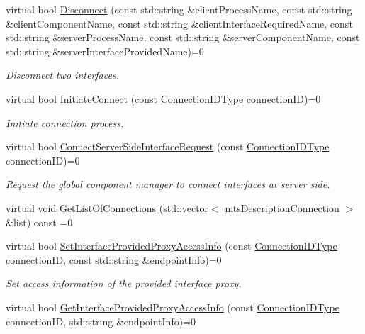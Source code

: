 \begin{DoxyCompactItemize}
virtual bool \hyperlink{classmts_manager_global_interface_a634c44151f8ef120526bc2be0cc3eb9a}{Disconnect} (const std\+::string \&client\+Process\+Name, const std\+::string \&client\+Component\+Name, const std\+::string \&client\+Interface\+Required\+Name, const std\+::string \&server\+Process\+Name, const std\+::string \&server\+Component\+Name, const std\+::string \&server\+Interface\+Provided\+Name)=0
\begin{DoxyCompactList}\small\item\em Disconnect two interfaces. \end{DoxyCompactList}\item 
virtual bool \hyperlink{classmts_manager_global_interface_aa9e2d02acd143d1a3ec7b7cc50c394ef}{Initiate\+Connect} (const \hyperlink{mts_forward_declarations_8h_ad3543bb11742e1766374ec96016d6547}{Connection\+I\+D\+Type} connection\+I\+D)=0
\begin{DoxyCompactList}\small\item\em Initiate connection process. \end{DoxyCompactList}\item 
virtual bool \hyperlink{classmts_manager_global_interface_a997fe786b674ece0eaf077040f170e08}{Connect\+Server\+Side\+Interface\+Request} (const \hyperlink{mts_forward_declarations_8h_ad3543bb11742e1766374ec96016d6547}{Connection\+I\+D\+Type} connection\+I\+D)=0
\begin{DoxyCompactList}\small\item\em Request the global component manager to connect interfaces at server side. \end{DoxyCompactList}\item 
virtual void \hyperlink{classmts_manager_global_interface_a95665a4a3b83ac9ca2e0e883832f657c}{Get\+List\+Of\+Connections} (std\+::vector$<$ mts\+Description\+Connection $>$ \&list) const =0
\item 
virtual bool \hyperlink{classmts_manager_global_interface_a40dab0f138d6305055bda1ce2f852f6e}{Set\+Interface\+Provided\+Proxy\+Access\+Info} (const \hyperlink{mts_forward_declarations_8h_ad3543bb11742e1766374ec96016d6547}{Connection\+I\+D\+Type} connection\+I\+D, const std\+::string \&endpoint\+Info)=0
\begin{DoxyCompactList}\small\item\em Set access information of the provided interface proxy. \end{DoxyCompactList}\item 
virtual bool \hyperlink{classmts_manager_global_interface_ade5d23408244c8bbecec7809419676c6}{Get\+Interface\+Provided\+Proxy\+Access\+Info} (const \hyperlink{mts_forward_declarations_8h_ad3543bb11742e1766374ec96016d6547}{Connection\+I\+D\+Type} connection\+I\+D, std\+::string \&endpoint\+Info)=0

\end{DoxyCompactItemize}
